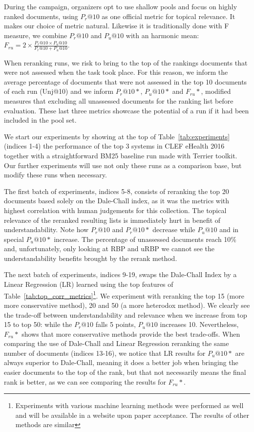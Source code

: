 During the campaign, organizers opt to use shallow pools and focus on highly ranked documents, using $P_r@10$ as one official metric for topical relevance.
It makes our choice of metric natural. Likewise it is traditionally done with F measure, we combine $P_r@10$ and $P_u@10$ with an harmonic mean: $F_{ru} = 2 \times \frac{P_r@10 \times P_u@10}{P_r@10 + P_u@10}$. 

When reranking runs, we risk to bring to the top of the rankings documents that were not assessed when the task took place. For this reason, we inform the average percentage of documents that were not assessed in the top 10 documents of each run (Unj@10) and we inform $P_r@10*$, $P_u@10*$ and $F_{ru}*$, modified measures that excluding all unassessed documents for the ranking list before evaluation.
These last three metrics showcase the potential of a run if it had been included in the pool set.

We start our experiments by showing at the top of Table~\ref{tab:experiments} (indices 1-4) the performance of the top 3 systems in CLEF eHealth 2016 together with a straightforward BM25 baseline run made with Terrier toolkit. Our further experiments will use not only these runs as a comparison base, but modify these runs when necessary.

The first batch of experiments, indices 5-8, consists of reranking the top 20 documents based solely on the Dale-Chall index, as it was the metrics with highest correlation with human judgements for this collection.
The topical relevance of the reranked resulting lists is immediately hurt in benefit of understandability. Note how $P_r@10$ and $P_r@10*$ decrease while $P_u@10$ and in special $P_u@10*$ increase.
The percentage of unassessed documents reach 10\% and, unfortunately, only looking at RBP and uRBP we cannot see the understandability benefits brought by the rerank method.

The next batch of experiments, indices 9-19, swaps the Dale-Chall Index by a Linear Regression (LR) learned using the top features of Table~\ref{tab:top_corr_metrics}\footnote{Experiments with various machine learning methods were performed as well and will be available in a website upon paper acceptance. The results of other methods are similar}. 
We experiment with reranking the top 15 (more more conservative method), 20 and 50 (a more heterodox method). We clearly see the trade-off between understandability and relevance when we increase from top 15 to top 50: while the $P_r@10$ falls 5 points, $P_u@10$ increases 10. Nevertheless, $F_{ru}*$ shows that more conservative methods provide the best trade-offs.
When comparing the use of Dale-Chall and Linear Regression reranking the same number of documents (indices 13-16), we notice that LR results for $P_u@10*$ are always superior to Dale-Chall, meaning it does a better job when bringing the easier documents to the top of the rank, but that not necessarily means the final rank is better, as we can see comparing the results for $F_{ru}*$.

